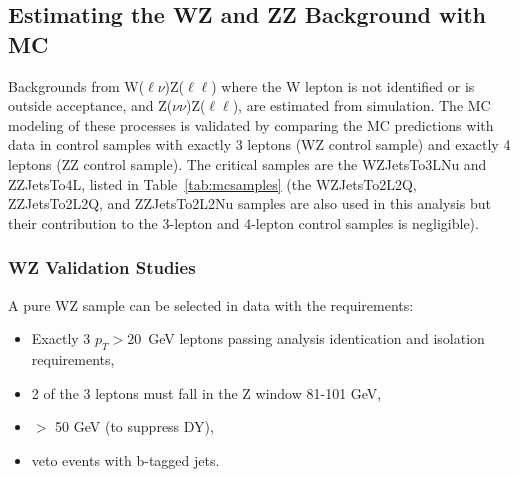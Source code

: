 \clearpage

\subsection{Estimating the WZ and ZZ Background with MC}
\label{sec:bkg_vz}

Backgrounds from W($\ell\nu$)Z($\ell\ell$) where the W lepton is not identified or is outside acceptance, and Z($\nu\nu$)Z($\ell\ell$),
are estimated from simulation. The MC modeling of these processes is validated by comparing the MC predictions with data in control samples
with exactly 3 leptons (WZ control sample) and exactly 4 leptons (ZZ control sample). 
The critical samples are the WZJetsTo3LNu and ZZJetsTo4L, listed in Table~\ref{tab:mcsamples}
(the WZJetsTo2L2Q, ZZJetsTo2L2Q, and ZZJetsTo2L2Nu samples are also used in this analysis but their contribution to the 3-lepton and 4-lepton
control samples is negligible).

\subsubsection{WZ Validation Studies}
\label{sec:bkg_wz}

A pure WZ sample can be selected in data with the requirements:

\begin{itemize}
\item Exactly 3 $p_T>20$~GeV leptons passing analysis identication and isolation requirements,
\item 2 of the 3 leptons must fall in the Z window 81-101 GeV,
\item \MET $>$ 50 GeV (to suppress DY),
\item veto events with b-tagged jets.
\end{itemize}


